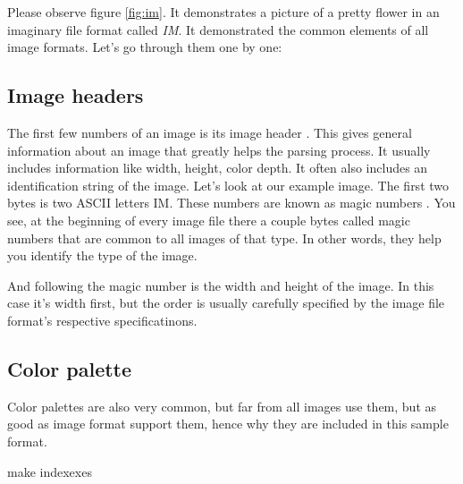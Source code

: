 \begin{refsection}
  Please observe figure \ref{fig:im}. It demonstrates a picture of a
  pretty flower in an imaginary
  file format called \textit{IM}. It demonstrated the common elements
  of all image formats. Let's go through them one by one:

  \subsection{Image headers}
  \label{sec:image-headers}

  The first few numbers of an image is its image header . This gives general information about an image that
  greatly helps the parsing process. It usually includes information
  like width, height, color depth. It often also includes an
  identification string of the image. Let's look at our example
  image. The first two bytes is two ASCII letters IM. These numbers
  are known as magic numbers . You see, at the beginning of every image
  file there a couple bytes called magic numbers that are common to
  all images of that type. In other words, they help you identify the
  type of the image.

  And following the magic number is the width and height of the
  image. In this case it's width first, but the order is usually
  carefully specified by the image file format's respective
  specificatinons.

  \subsection{Color palette}
  \label{sec:color-pallete}

  Color palettes  are also very common, but far from all images use
  them, but as good as image format support them, hence why they are
  included in this sample format.

  make indexexes

  \printbibliography[heading=subbibliography]

\end{refsection}